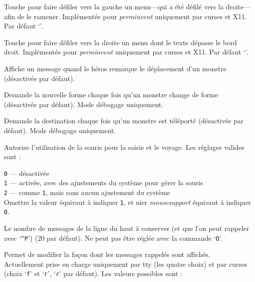 \documentclass[titlepage]{article}
\begin{document}
\begin{description}[font=\mdseries\itshape]
\item[menu\textunderscore shift\textunderscore left]
Touche pour faire défiler vers la gauche un menu---qui a été
défilé vers la droite---afin de le ramener.
Implémentée pour \textit{perm\textunderscore invent} uniquement par curses et X11.
Par défaut `\texttt{\textbraceleft}'.

\item[menu\textunderscore shift\textunderscore right]
Touche pour faire défiler vers la droite un menu dont le texte dépasse le
bord droit.
Implémentée pour \textit{perm\textunderscore invent} uniquement par curses et X11.
Par défaut `\texttt{\textbraceright}'.
\item[mon\textunderscore movement]
Affiche un message quand le héros remarque le déplacement d'un monstre (désactivée par défaut).
\item[monpolycontrol]
Demande la nouvelle forme chaque fois qu'un monstre change de forme (désactivée par défaut).
Mode débogage uniquement.
\item[montelecontrol]
Demande la destination chaque fois qu'un monstre est téléporté (désactivée par défaut).
Mode débogage uniquement.
\item[mouse\textunderscore support]
Autorise l'utilisation de la souris pour la saisie et le voyage.
Les réglages valides sont :

\texttt{0} --- désactivée\\
\texttt{1} --- activée, avec des ajustements du système pour gérer la souris\\
\texttt{2} --- comme \texttt{1}, mais sans aucun ajustement du système\\

Omettre la valeur équivaut à indiquer \texttt{1},
et nier
\textit{mouse\textunderscore support}
équivaut à indiquer \texttt{0}.
\item[msghistory]
Le nombre de messages de la ligne du haut à conserver (et que l'on peut rappeler
avec `\texttt{\textasciicircum P}') (20 par défaut).
Ne peut pas être réglée avec la commande `\texttt{O}'.
\item[msg\textunderscore window]
Permet de modifier la façon dont les messages rappelés sont affichés.
Actuellement prise en charge uniquement par tty (les quatre choix) et par curses
(choix `\texttt{f}' et `\texttt{r}', `\texttt{r}' par défaut).
Les valeurs possibles sont :


\end{description}
\end{document}
